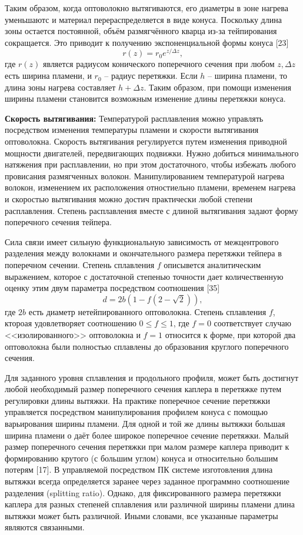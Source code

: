 Таким образом, когда оптоволокно вытягиваются, его диаметры в зоне нагрева уменьшаютс и материал перераспределяется в виде конуса. Поскольку длина зоны остается постоянной, объём размягчённого кварца из-за тейпирования сокращается. Это приводит к получению экспоненциальной формы конуса [23]
\begin{equation}\label{eq_ch3_2.27}
  r(z)=r_0 e^{z/\Delta z},
\end{equation}
где $r(z)$ является радиусом конического поперечного сечения при любом $z, \Delta z$ есть ширина пламени, и $r_0$ -- радиус перетяжки. Если $h$ -- ширина пламени, то длина зоны нагрева составляет $h+\Delta z$. Таким образом, при помощи изменения ширины пламени становится возможным изменение длины перетяжки конуса.

\textbf{Скорость вытягивания:} Температурой расплавления можно управлять посредством изменения температуры пламени и скорости вытягивания оптоволокна. Скорость вытягивания регулируется путем изменения приводной мощности двигателей, передвигающих подвижки. Нужно добиться минимального натяжения при расплавлении, но при этом достаточного, чтобы избежать любого провисания размягченных волокон. Манипулированием температурой нагрева волокон, изменением их расположения отностиельно пламени, временем нагрева и скоростью вытягивания можно достич практически любой степени расплавления. Степень расплавления вместе с длиной вытягивания задают форму поперечного сечения тейпера.

Сила связи имеет сильную функциональную зависимость от межцентрового разделения между волокнами и окончательного размера перетяжки тейпера в поперечном сечении. Степень сплавления $f$ описывется аналитическим выражением, которое с достаточной степенью точности дает количественную оценку этим двум параметра посредством соотношения [35]
\begin{equation}\label{eq_ch3_2.28_1}
  d=2b(1-f(2-\sqrt{2})),
\end{equation}
где $2b$ есть диаметр нетейпированного оптоволокна. Степень сплавления $f$, ктороая удовлетворяет соотношению $0 \le f \le 1$, где $f=0$ соответствует случаю <<изолированного>> оптоволокна и $f=1$ относится к форме, при которой два оптоволокна были полностью сплавлены до образования круглого поперечного сечения.

Для заданного уровня сплавления и продольного профиля, может быть достигнут любой необходимый размер поперечного сечения каплера в перетяжке путем регулировки длины вытяжки. На практике поперечное сечение перетяжки управляется посредством манипулирования профилем конуса с помощью варьирования ширины пламени. Для одной и той же длины вытяжки большая ширина пламени о даёт более широкое поперечное сечение перетяжки. Малый размер поперечного сечения перетяжки при малом размере каплера приводит к формированию крутого (с большим углом) конуса и относительно большим потерям [17]. В управляемой посредством ПК системе изготовления длина вытяжки всегда определяется заранее через заданное программно соотношение разделения (splitting ratio). Однако, для фиксированного размера перетяжки каплера для разных степеней сплавления или различной ширины пламени длина вытяжки может быть различной. Иными словами, все указанные параметры являются связанными.

